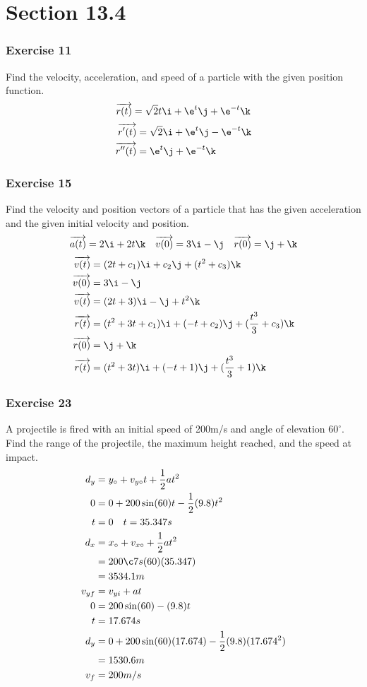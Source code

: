 \documentclass{math}
\begin{document}
\section*{Section 13.4}

\subsubsection*{Exercise 11}
Find the velocity, acceleration, and speed of a particle with the given position
function.
\[ \overrightarrow{r(t)} = \sqrt{2}t\i+\e^t\j+\e^{-t}\k \]
\begin{align*}
  \overrightarrow{r'(t)} &= \sqrt{2}\i+\e^t\j-\e^{-t}\k \\
  \overrightarrow{r''(t)} &= \e^t\j+\e^{-t}\k
\end{align*}

\subsubsection*{Exercise 15}
Find the velocity and position vectors of a particle that has the given
acceleration and the given initial velocity and position.
\[ \overrightarrow{a(t)} = 2\i+2t\k \quad \overrightarrow{v(0)} = 3\i-\j \quad
  \overrightarrow{r(0)} = \j+\k \]
\begin{align*}
  \overrightarrow{v(t)} &= (2t+c_1)\i+c_2\j+(t^2+c_3)\k \\
  \overrightarrow{v(0)} &= 3\i-\j \\
  \overrightarrow{v(t)} &= (2t+3)\i-\j+t^2\k \\
  \overrightarrow{r(t)} &= (t^2+3t+c_1)\i+(-t+c_2)\j+(\frac{t^3}{3}+c_3)\k \\
  \overrightarrow{r(0)} &= \j+\k \\
  \overrightarrow{r(t)} &= (t^2+3t)\i+(-t+1)\j+(\frac{t^3}{3}+1)\k
\end{align*}

\subsubsection*{Exercise 23}
A projectile is fired with an initial speed of 200m/s and angle of elevation
\( 60^{\circ} \). Find the range of the projectile, the maximum height reached,
and the speed at impact.
\begin{align*}
  d_y &= y_{\circ}+v_{y\circ}t+\frac{1}{2}at^2 \\
  0 &= 0+200\sin(60)t-\frac{1}{2}(9.8)t^2 \\
  t &= 0 \quad t = 35.347s \\
  d_x &= x_{\circ}+v_{x\circ}+\frac{1}{2}at^2 \\
  &= 200\c7s(60)(35.347) \\
  &= 3534.1m \\
  v_{yf} &= v_{yi}+at \\
  0 &= 200\sin(60)-(9.8)t \\
  t &= 17.674s \\
  d_y &= 0+200\sin(60)(17.674)-\frac{1}{2}(9.8)(17.674^2) \\
  &= 1530.6m \\
  v_f &= 200m/s
\end{align*}
\end{document}

